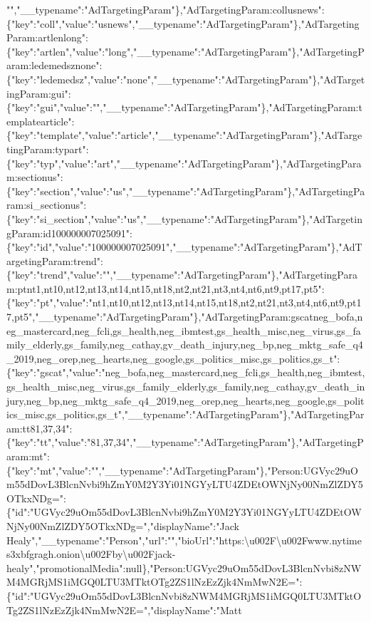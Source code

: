 "","\_\_typename":"AdTargetingParam"\},"AdTargetingParam:collusnews":\{"key":"coll","value":"usnews","\_\_typename":"AdTargetingParam"\},"AdTargetingParam:artlenlong":\{"key":"artlen","value":"long","\_\_typename":"AdTargetingParam"\},"AdTargetingParam:ledemedsznone":\{"key":"ledemedsz","value":"none","\_\_typename":"AdTargetingParam"\},"AdTargetingParam:gui":\{"key":"gui","value":"","\_\_typename":"AdTargetingParam"\},"AdTargetingParam:templatearticle":\{"key":"template","value":"article","\_\_typename":"AdTargetingParam"\},"AdTargetingParam:typart":\{"key":"typ","value":"art","\_\_typename":"AdTargetingParam"\},"AdTargetingParam:sectionus":\{"key":"section","value":"us","\_\_typename":"AdTargetingParam"\},"AdTargetingParam:si\_sectionus":\{"key":"si\_section","value":"us","\_\_typename":"AdTargetingParam"\},"AdTargetingParam:id100000007025091":\{"key":"id","value":"100000007025091","\_\_typename":"AdTargetingParam"\},"AdTargetingParam:trend":\{"key":"trend","value":"","\_\_typename":"AdTargetingParam"\},"AdTargetingParam:ptnt1,nt10,nt12,nt13,nt14,nt15,nt18,nt2,nt21,nt3,nt4,nt6,nt9,pt17,pt5":\{"key":"pt","value":"nt1,nt10,nt12,nt13,nt14,nt15,nt18,nt2,nt21,nt3,nt4,nt6,nt9,pt17,pt5","\_\_typename":"AdTargetingParam"\},"AdTargetingParam:gscatneg\_bofa,neg\_mastercard,neg\_fcli,gs\_health,neg\_ibmtest,gs\_health\_misc,neg\_virus,gs\_family\_elderly,gs\_family,neg\_cathay,gv\_death\_injury,neg\_bp,neg\_mktg\_safe\_q4\_2019,neg\_orep,neg\_hearts,neg\_google,gs\_politics\_misc,gs\_politics,gs\_t":\{"key":"gscat","value":"neg\_bofa,neg\_mastercard,neg\_fcli,gs\_health,neg\_ibmtest,gs\_health\_misc,neg\_virus,gs\_family\_elderly,gs\_family,neg\_cathay,gv\_death\_injury,neg\_bp,neg\_mktg\_safe\_q4\_2019,neg\_orep,neg\_hearts,neg\_google,gs\_politics\_misc,gs\_politics,gs\_t","\_\_typename":"AdTargetingParam"\},"AdTargetingParam:tt81,37,34":\{"key":"tt","value":"81,37,34","\_\_typename":"AdTargetingParam"\},"AdTargetingParam:mt":\{"key":"mt","value":"","\_\_typename":"AdTargetingParam"\},"Person:UGVyc29uOm55dDovL3BlcnNvbi9hZmY0M2Y3Yi01NGYyLTU4ZDEtOWNjNy00NmZlZDY5OTkxNDg=":\{"id":"UGVyc29uOm55dDovL3BlcnNvbi9hZmY0M2Y3Yi01NGYyLTU4ZDEtOWNjNy00NmZlZDY5OTkxNDg=","displayName":"Jack
Healy","\_\_typename":"Person","url":"","bioUrl":"https:\textbackslash{}u002F\textbackslash{}u002Fwww.nytimes3xbfgragh.onion\textbackslash{}u002Fby\textbackslash{}u002Fjack-healy","promotionalMedia":null\},"Person:UGVyc29uOm55dDovL3BlcnNvbi8zNWM4MGRjMS1iMGQ0LTU3MTktOTg2ZS1lNzEzZjk4NmMwN2E=":\{"id":"UGVyc29uOm55dDovL3BlcnNvbi8zNWM4MGRjMS1iMGQ0LTU3MTktOTg2ZS1lNzEzZjk4NmMwN2E=","displayName":"Matt
